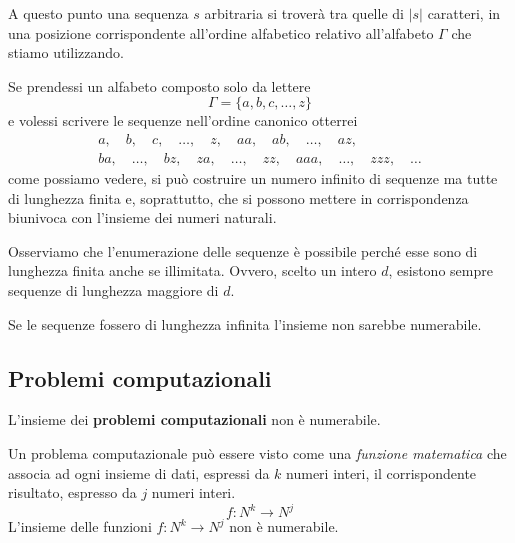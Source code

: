A questo punto una sequenza $s$ arbitraria si trover\`a tra quelle di $| s |$ caratteri, in una posizione corrispondente
all'ordine alfabetico relativo all'alfabeto $\Gamma$ che stiamo utilizzando.

\begin{example}
	Se prendessi un alfabeto composto solo da lettere
	\[ \Gamma = \{ a, b, c, \dots, z \} \]
	e volessi scrivere le sequenze nell'ordine canonico otterrei
	\begin{gather*}
		a, \quad b, \quad c, \quad \dots, \quad z, \quad aa, \quad ab, \quad \dots, \quad az, \\
		ba, \quad \dots, \quad bz, \quad za, \quad \dots, \quad zz, \quad aaa, \quad \dots, \quad zzz, \quad \dots
	\end{gather*}
	come possiamo vedere, si pu\`o costruire un numero infinito di sequenze ma tutte di lunghezza finita e, soprattutto,
	che si possono mettere in corrispondenza biunivoca con l'insieme dei numeri naturali.
\end{example}

Osserviamo che l'enumerazione delle sequenze \`e possibile perch\'e esse sono di lunghezza finita anche se illimitata.
Ovvero, scelto un intero $d$, esistono sempre sequenze di lunghezza maggiore di $d$.

Se le sequenze fossero di lunghezza infinita l'insieme non sarebbe numerabile.

\subsection{Problemi computazionali}
\begin{theorem}
	L'insieme dei \textbf{problemi computazionali} non \`e numerabile.
\end{theorem}

Un problema computazionale pu\`o essere visto come una \emph{funzione matematica} che associa ad ogni insieme di dati,
espressi da $k$ numeri interi, il corrispondente risultato, espresso da $j$ numeri interi.
\[ f : N^k \rightarrow N^j \]
L'insieme delle funzioni $f : N^k \rightarrow N^j$ non \`e numerabile.


